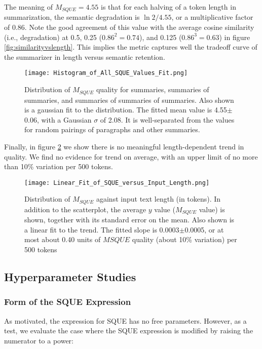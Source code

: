 \documentclass{article}
\begin{document}
{The meaning of $M_{SQUE}=4.55$ is that for each halving of a token length in summarization, the semantic degradation is $\ln{2}/4.55$, or a multiplicative factor of 0.86.  
Note the good agreement of this value with the average cosine similarity (i.e., degradation) at 0.5, 0.25 ($0.86^2=0.74$), and 0.125 ($0.86^3=0.63$) in figure \ref{fig:similarityvslength}.
This implies the metric captures well the tradeoff curve of the summarizer in length versus semantic retention.

\begin{figure}
	\centering
	\texttt{[image: Histogram\_of\_All\_SQUE\_Values\_Fit.png]}
	\caption{Distribution of $M_{SQUE}$ quality for summaries, summaries of summaries, and summaries of summaries of summaries.  Also shown is a gaussian fit to the distribution.  The fitted mean value is 4.55$\pm$0.06, with a Gaussian $\sigma$ of 2.08.  It is well-separated from the values for random pairings of paragraphs and other summaries.}
	\label{fig:msque}
\end{figure}

Finally, in figure \ref{fig:msque_trend} we show there is no meaningful length-dependent trend in quality.  We find no evidence for trend on average, with an upper limit of no more than 10\% variation per 500 tokens.

\begin{figure}
	\centering
	\texttt{[image: Linear\_Fit\_of\_SQUE\_versus\_Input\_Length.png]}
	\caption{Distribution of $M_{SQUE}$ against input text length (in tokens). In addition to the scatterplot, the average $y$ value ($M_{SQUE}$ value) is shown, together with its standard error on the mean.  Also shown is a linear fit to the trend.  The fitted slope is 0.0003$\pm$0.0005, or at most about 0.40 units of $M{SQUE}$ quality (about 10\% variation) per 500 tokens}
	\label{fig:msque_trend}
\end{figure}


\subsection{Hyperparameter Studies}

\subsubsection{Form of the SQUE Expression}

As motivated, the expression for SQUE has no free parameters.  
However, as a test, we evaluate the case where the SQUE expression is modified by raising the numerator to a power:

}
\end{document}

